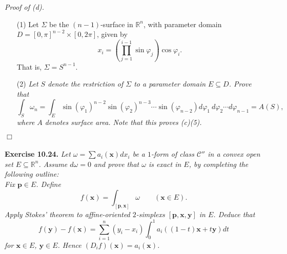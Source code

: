 \documentclass{article}
\begin{document}
\emph{Proof of (d).}
\begin{enumerate}
\item[(1)]
  Let $\Sigma$ be the $(n-1)$-surface in $\mathbb{R}^n$,
  with parameter domain $D = [0,\pi]^{n-2} \times [0,2\pi]$,
  given by
  \[
    x_i = \left( \prod_{j=1}^{i-1} \sin\varphi_j \right) \cos\varphi_i.
  \]
  That is, $\Sigma = S^{n-1}$.

\item[(2)]
  \emph{Let $S$ denote the restriction of $\Sigma$ to a parameter domain $E \subseteq D$.
  Prove that
  \[
    \int_{S} \omega_n
    = \int_{E}  \sin(\varphi_1)^{n-2} \sin(\varphi_2)^{n-3} \cdots \sin(\varphi_{n-2})
      d\varphi_1 \: d\varphi_2 \cdots d\varphi_{n-1}
    = A(S),
  \]
  where $A$ denotes surface area.
  Note that this proves (c)(5).}

\end{enumerate}
$\Box$ \\\\






\textbf{Exercise 10.24.}
\emph{Let $\omega = \sum a_i(\mathbf{x}) dx_i$ be a $1$-form of class $\mathscr{C}''$
in a convex open set $E \subseteq \mathbb{R}^n$.
Assume $d\omega = 0$ and prove that $\omega$ is exact in $E$,
by completing the following outline:} \\

\emph{Fix $\mathbf{p} \in E$.
Define
\[
  f(\mathbf{x}) = \int_{[\mathbf{p},\mathbf{x}]} \omega
  \qquad
  (\mathbf{x} \in E).
\]
Apply Stokes' theorem to affine-oriented $2$-simplexs $[\mathbf{p},\mathbf{x},\mathbf{y}]$ in $E$.
Deduce that
\[
  f(\mathbf{y}) - f(\mathbf{x})
  = \sum_{i=1}^{n}(y_i - x_i) \int_{0}^{1} a_i((1-t)\mathbf{x} + t\mathbf{y}) dt
\]
for $\mathbf{x} \in E$, $\mathbf{y} \in E$.
Hence $(D_i f)(\mathbf{x}) = a_i(\mathbf{x})$.} \\
\end{document}
